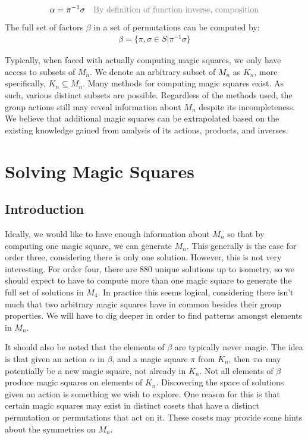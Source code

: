\documentclass[12pt]{report}
\def\light#1{{\color{light}#1}}
\begin{document}
\begin{align}
  \alpha=\pi^{-1}\sigma &  & \text{\light{By definition of function inverse, composition}}
\end{align}
The full set of factors $\beta$ in a set of permutations can be computed by:
\begin{align}
  \beta = \{\pi,\sigma\in S | \pi^{-1}\sigma\}
\end{align}

\par Typically, when faced with actually computing magic squares, we only have access to subsets of
$M_n$. We denote an arbitrary subset of $M_n$ as $K_n$, more specifically, $K_n \subseteq M_n$.
Many methods for computing magic squares exist. As such, various distinct subsets are possible.
Regardless of the methods used, the group actions still may reveal information about $M_n$ despite
its incompleteness. We believe that additional magic squares can be extrapolated based on the
existing knowledge gained from analysis of its actions, products, and inverses.

\chapter{Solving Magic Squares}

\section{Introduction}

\par Ideally, we would like to have enough information about $M_n$ so that by computing one magic
square, we can generate $M_n$. This generally is the case for order three, considering there is
only one solution. However, this is not very interesting. For order four, there are 880 unique
solutions up to isometry, so we should expect to have to compute more than one magic square to
generate the full set of solutions in $M_4$. In practice this seems logical, considering there
isn't much that two arbitrary magic squares have in common besides their group properties. We will
have to dig deeper in order to find patterns amongst elements in $M_n$.

\par It should also be noted that the elements of $\beta$ are typically never magic. The idea is
that given an action $\alpha$ in $\beta$, and a magic square $\pi$ from $K_n$, then $\pi\alpha$ may
potentially be a new magic square, not already in $K_n$. Not all elements of $\beta$ produce magic
squares on elements of $K_n$. Discovering the space of solutions given an action is something we
wish to explore. One reason for this is that certain magic squares may exist in distinct cosets
that have a distinct permutation or permutations that act on it. These cosets may provide some
hints about the symmetries on $M_n$.
\end{document}
